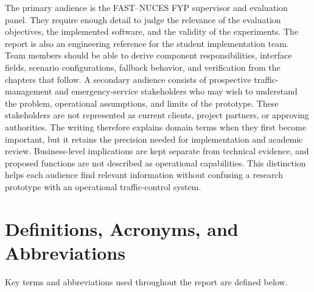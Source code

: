 The primary audience is the FAST--NUCES FYP supervisor and evaluation panel. They require enough detail to judge the relevance of the evaluation objectives, the implemented software, and the validity of the experiments. The report is also an engineering reference for the student implementation team. Team members should be able to derive component responsibilities, interface fields, scenario configurations, fallback behavior, and verification from the chapters that follow. A secondary audience consists of prospective traffic-management and emergency-service stakeholders who may wish to understand the problem, operational assumptions, and limits of the prototype. These stakeholders are not represented as current clients, project partners, or approving authorities. The writing therefore explains domain terms when they first become important, but it retains the precision needed for implementation and academic review. Business-level implications are kept separate from technical evidence, and proposed functions are not described as operational capabilities. This distinction helps each audience find relevant information without confusing a research prototype with an operational traffic-control system.

\section{Definitions, Acronyms, and Abbreviations}

Key terms and abbreviations used throughout the report are defined below.

